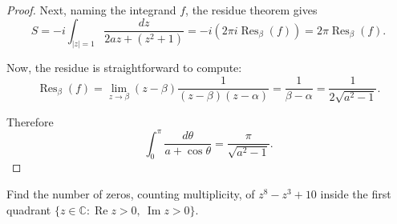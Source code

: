 \documentclass{article}
\newenvironment{problem}[2][Problem]{\begin{trivlist}
\item[\hskip \labelsep {\bfseries #1}\hskip \labelsep {\bfseries #2.}]}{\end{trivlist}}
\begin{document}
\begin{proof}
  Next, naming the integrand $f$, the residue theorem gives \[
    S = -i\int_{|z| = 1} \frac{dz}{2az + \left(z^2 + 1\right)} = -i(2\pi i \operatorname{Res}_\beta(f)) = 2\pi \operatorname{Res}_\beta(f).
  \]

  Now, the residue is straightforward to compute: \[
    \operatorname{Res}_\beta(f)
    = \lim_{z \rightarrow \beta} (z - \beta)\frac{1}{(z - \beta)(z - \alpha)}
    = \frac{1}{\beta - \alpha}
    = \frac{1}{2\sqrt{a^2 - 1}}.
  \]

  Therefore \[
    \int_0^\pi \frac{d\theta}{a + \cos\theta} = \frac{\pi}{\sqrt{a^2 - 1}}.
  \]
\end{proof}

\pagebreak

\begin{problem}{2}
  Find the number of zeros, counting multiplicity, of $z^8 - z^3 + 10$ inside
  the first quadrant
  $\{ z \in \mathbb{C}: \operatorname{Re}z > 0,\ \operatorname{Im}z > 0 \}$.
\end{problem}
\end{document}
